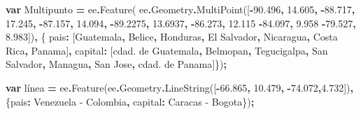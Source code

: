 \documentclass[
  12pt,
  letterpaper,
  twoside]{book}
\newenvironment{Shaded}{\begin{snugshade}}{\end{snugshade}}
\newcommand{\AttributeTok}[1]{\textcolor[rgb]{0.77,0.63,0.00}{#1}}
\newcommand{\DataTypeTok}[1]{\textcolor[rgb]{0.13,0.29,0.53}{#1}}
\newcommand{\FloatTok}[1]{\textcolor[rgb]{0.00,0.00,0.81}{#1}}
\newcommand{\FunctionTok}[1]{\textcolor[rgb]{0.00,0.00,0.00}{#1}}
\newcommand{\KeywordTok}[1]{\textcolor[rgb]{0.13,0.29,0.53}{\textbf{#1}}}
\newcommand{\NormalTok}[1]{#1}
\newcommand{\OperatorTok}[1]{\textcolor[rgb]{0.81,0.36,0.00}{\textbf{#1}}}
\newcommand{\StringTok}[1]{\textcolor[rgb]{0.31,0.60,0.02}{#1}}
\begin{document}
\begin{Shaded}
\begin{Highlighting}[]
\KeywordTok{var}\NormalTok{ Multipunto }\OperatorTok{=}\NormalTok{ ee}\OperatorTok{.}\FunctionTok{Feature}\NormalTok{(}
\NormalTok{ee}\OperatorTok{.}\AttributeTok{Geometry}\OperatorTok{.}\FunctionTok{MultiPoint}\NormalTok{([}\OperatorTok{{-}}\FloatTok{90.496}\OperatorTok{,} \FloatTok{14.605}\OperatorTok{,}                               
                        \OperatorTok{{-}}\FloatTok{88.717}\OperatorTok{,} \FloatTok{17.245}\OperatorTok{,}                              
                        \OperatorTok{{-}}\FloatTok{87.157}\OperatorTok{,} \FloatTok{14.094}\OperatorTok{,}
                        \OperatorTok{{-}}\FloatTok{89.2275}\OperatorTok{,} \FloatTok{13.6937}\OperatorTok{,}
                        \OperatorTok{{-}}\FloatTok{86.273}\OperatorTok{,} \FloatTok{12.115}
                        \OperatorTok{{-}}\FloatTok{84.097}\OperatorTok{,} \FloatTok{9.958}
                        \OperatorTok{{-}}\FloatTok{79.527}\OperatorTok{,} \FloatTok{8.983}\NormalTok{])}\OperatorTok{,}
\NormalTok{    \{ }\DataTypeTok{pais}\OperatorTok{:}\NormalTok{ [}\StringTok{\textquotesingle{}Guatemala\textquotesingle{}}\OperatorTok{,} 
        \StringTok{\textquotesingle{}Belice\textquotesingle{}}\OperatorTok{,} 
        \StringTok{\textquotesingle{}Honduras\textquotesingle{}}\OperatorTok{,} 
        \StringTok{\textquotesingle{}El Salvador\textquotesingle{}}\OperatorTok{,} 
        \StringTok{\textquotesingle{}Nicaragua\textquotesingle{}}\OperatorTok{,} 
        \StringTok{\textquotesingle{}Costa Rica\textquotesingle{}}\OperatorTok{,} 
        \StringTok{\textquotesingle{}Panama\textquotesingle{}}\NormalTok{]}\OperatorTok{,}
      \DataTypeTok{capital}\OperatorTok{:}\NormalTok{  [}\StringTok{\textquotesingle{}cdad. de Guatemala\textquotesingle{}}\OperatorTok{,} 
            \StringTok{\textquotesingle{}Belmopan\textquotesingle{}}\OperatorTok{,} 
            \StringTok{\textquotesingle{}Tegucigalpa\textquotesingle{}}\OperatorTok{,} 
            \StringTok{\textquotesingle{}San Salvador\textquotesingle{}}\OperatorTok{,} 
            \StringTok{\textquotesingle{}Managua\textquotesingle{}}\OperatorTok{,} 
            \StringTok{\textquotesingle{}San Jose\textquotesingle{}}\OperatorTok{,} 
            \StringTok{\textquotesingle{}cdad. de Panama\textquotesingle{}}\NormalTok{]\})}\OperatorTok{;}

\KeywordTok{var}\NormalTok{ línea }\OperatorTok{=}\NormalTok{ ee}\OperatorTok{.}\FunctionTok{Feature}\NormalTok{(ee}\OperatorTok{.}\AttributeTok{Geometry}\OperatorTok{.}\FunctionTok{LineString}\NormalTok{([}\OperatorTok{{-}}\FloatTok{66.865}\OperatorTok{,} \FloatTok{10.479}\OperatorTok{,}                    
                            \OperatorTok{{-}}\FloatTok{74.072}\OperatorTok{,}\FloatTok{4.732}\NormalTok{])}\OperatorTok{,}
\NormalTok{        \{}\DataTypeTok{pais}\OperatorTok{:} \StringTok{\textquotesingle{}Venezuela {-} Colombia\textquotesingle{}}\OperatorTok{,} 
\DataTypeTok{capital}\OperatorTok{:} \StringTok{\textquotesingle{}Caracas {-} Bogota\textquotesingle{}}\NormalTok{\})}\OperatorTok{;} 


\end{Highlighting}
\end{Shaded}
\end{document}
